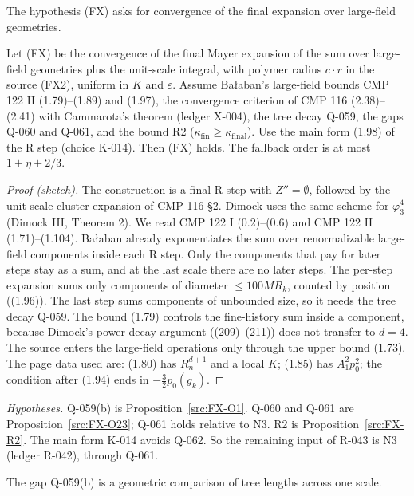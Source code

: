 The hypothesis (FX) asks for convergence of the final expansion over large-field geometries.

\begin{proposition}[Reduction of (FX)]\label{src:FX}
Let (FX) be the convergence of the final Mayer expansion of the sum over large-field geometries plus the unit-scale integral, with polymer radius $c\cdot r$ in the source (FX2), uniform in $K$ and $\varepsilon$. Assume Ba{\l}aban's large-field bounds CMP 122 II (1.79)--(1.89) and (1.97), the convergence criterion of CMP 116 (2.38)--(2.41) with Cammarota's theorem (ledger X-004), the tree decay Q-059, the gaps Q-060 and Q-061, and the bound R2 ($\kappa_{\mathrm{fin}}\ge\kappa_{\mathrm{final}}$). Use the main form (1.98) of the R step (choice K-014). Then (FX) holds. The fallback order is at most $1+\eta+2/3$.
\end{proposition}
\begin{proof}[Proof (sketch)]
The construction is a final R-step with $Z''=\emptyset$, followed by the unit-scale cluster expansion of CMP 116 \S2. Dimock uses the same scheme for $\varphi^4_3$ (Dimock III, Theorem 2). We read CMP 122 I (0.2)--(0.6) and CMP 122 II (1.71)--(1.104). Ba{\l}aban already exponentiates the sum over renormalizable large-field components inside each R step. Only the components that pay for later steps stay as a sum, and at the last scale there are no later steps. The per-step expansion sums only components of diameter $\le100MR_k$, counted by position ((1.96)). The last step sums components of unbounded size, so it needs the tree decay Q-059. The bound (1.79) controls the fine-history sum inside a component, because Dimock's power-decay argument ((209)--(211)) does not transfer to $d=4$. The source enters the large-field operations only through the upper bound (1.73). The page data used are: (1.80) has $R_n^{d+1}$ and a local $K$; (1.85) has $A_1^2p_0^2$; the condition after (1.94) ends in $-\tfrac32p_0(g_k)$.
\end{proof}
\emph{Hypotheses.} Q-059(b) is Proposition~\ref{src:FX-O1}. Q-060 and Q-061 are Proposition~\ref{src:FX-O23}; Q-061 holds relative to N3. R2 is Proposition~\ref{src:FX-R2}. The main form K-014 avoids Q-062. So the remaining input of R-043 is N3 (ledger R-042), through Q-061.

The gap Q-059(b) is a geometric comparison of tree lengths across one scale.

